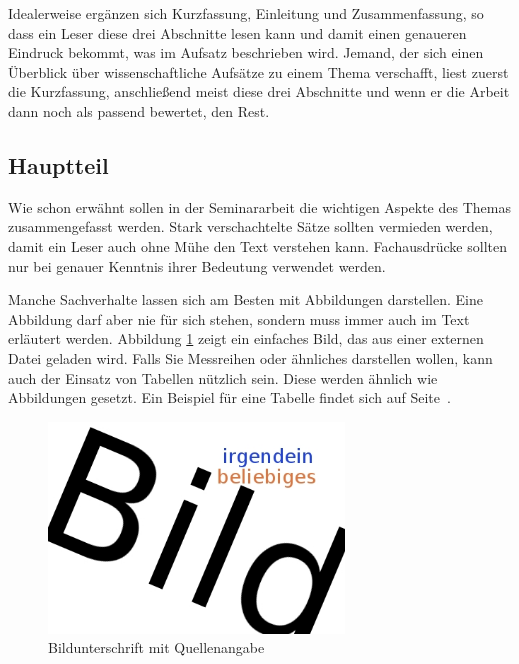 \documentclass[final,bibliography=totocnumbered]{include/sikseminar}
\begin{document}
Idealerweise ergänzen sich Kurzfassung, Einleitung und Zusammenfassung, so dass ein Leser diese drei Abschnitte lesen kann und damit einen genaueren Eindruck bekommt, was im Aufsatz beschrieben wird. Jemand, der sich einen Überblick über wissenschaftliche Aufsätze zu einem Thema verschafft, liest zuerst die Kurzfassung, anschließend meist diese drei Abschnitte und wenn er die Arbeit dann noch als passend bewertet, den Rest.

\subsection{Hauptteil}
Wie schon erwähnt sollen in der Seminararbeit die wichtigen Aspekte des Themas zusammengefasst werden. Stark verschachtelte Sätze sollten vermieden werden, damit ein Leser auch ohne Mühe den Text verstehen kann. Fachausdrücke sollten nur bei genauer Kenntnis ihrer Bedeutung verwendet werden.

Manche Sachverhalte lassen sich am Besten mit Abbildungen darstellen. Eine Abbildung darf aber nie für sich stehen, sondern muss immer auch im Text erläutert werden. Abbildung \ref{Fig:Bildbezeichnung} zeigt ein einfaches Bild, das aus einer externen Datei geladen wird. Falls Sie Messreihen oder ähnliches darstellen wollen, kann auch der Einsatz von Tabellen nützlich sein. Diese werden ähnlich wie Abbildungen gesetzt. Ein Beispiel für eine Tabelle findet sich auf Seite~\pageref{tab:dauer}.

\begin{figure}[htbp] %
  \centering
  \includegraphics[width=0.7\textwidth]{figures/bild1}
  \caption{Bildunterschrift mit Quellenangabe \cite{ungerer2013parmerasa}}
  \label{Fig:Bildbezeichnung}
\end{figure}
\end{document}
